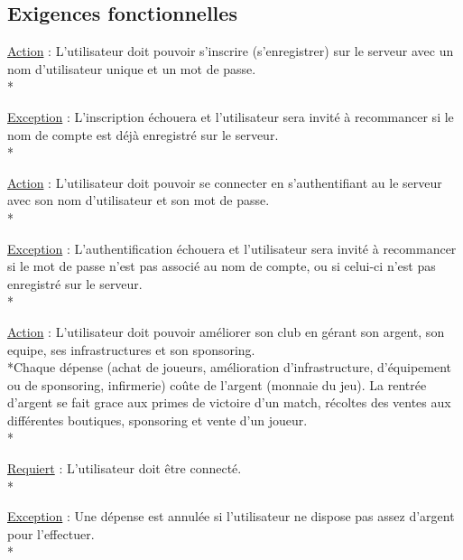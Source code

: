 \documentclass[a4paper]{article}
\begin{document}
	\subsection{Exigences fonctionnelles}
		\begin{description}[style=nextline]
			\item[Inscription :]
			\begin{description}[leftmargin=*] %
				\item[]
				\item \underline{Action} : L'utilisateur doit pouvoir s'inscrire (s'enregistrer) sur le serveur avec un nom d'utilisateur unique et un mot de passe.\\*
				\item \underline{Exception} : L'inscription échouera et l'utilisateur sera invité à recommancer si le nom de compte est déjà enregistré sur le serveur.\\*
			\end{description} %
			
			\item[Connection :]
			\begin{description}[leftmargin=*] %
				\item[]
				\item \underline{Action} : L'utilisateur doit pouvoir se connecter en s'authentifiant au le serveur avec son nom d'utilisateur et son mot de passe.\\*
				\item \underline{Exception} : L'authentification échouera et l'utilisateur sera invité à recommancer si le mot de passe n'est pas associé au nom de compte, ou si celui-ci n'est pas enregistré sur le serveur.\\*
			\end{description} %
			
			\item[Management :]
			\begin{description}[leftmargin=*] %
				\item[]
				\item \underline{Action} : L'utilisateur doit pouvoir améliorer son \gls{club} en gérant son argent, son \gls{equipe}, ses infrastructures et son sponsoring.\\*Chaque dépense (achat de joueurs, amélioration d'infrastructure, d'équipement ou de sponsoring, infirmerie) coûte de l'argent (monnaie du jeu). La rentrée d'argent se fait grace aux primes de victoire d'un match, récoltes des ventes aux différentes boutiques, sponsoring et vente d'un joueur.\\*
				\item \underline{Requiert} : L'utilisateur doit être connecté.\\*
				\item \underline{Exception} : Une dépense est annulée si l'utilisateur ne dispose pas assez d'argent pour l'effectuer.\\*
			\end{description} %
			

\end{description}
\end{document}
